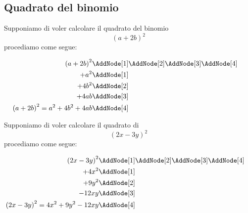 \subsection{Quadrato del binomio}
\begin{esempio}
Supponiamo di voler calcolare il quadrato del binomio \[\left(a+2b\right)^2 \]
procediamo come segue:
\begin{NodesList}
	\begin{align*}
		\left(a+2b\right)^2&\AddNode[1]\AddNode[2]\AddNode[3]\AddNode[4]\\
		+a^2&\AddNode[1]&\\ 
		+4b^2&\AddNode[2]&\\
		+4ab&\AddNode[3]\\
		\left(a+2b\right)^2=a^2+4b^2+4ab&\AddNode[4]
	\end{align*}
\end{NodesList}
\end{esempio}
\begin{esempio}
Supponiamo di voler calcolare il quadrato di \[ \left(2x-3y\right)^2\]
procediamo come segue:
\begin{NodesList}
	\begin{align*}
		\left(2x-3y\right)^2&\AddNode[1]\AddNode[2]\AddNode[3]\AddNode[4]\\
		+4x^2&\AddNode[1]&\\ 
		+9y^2&\AddNode[2]&\\
		-12xy&\AddNode[3]\\
		\left(2x-3y\right)^2=4x^2+9y^2-12xy&\AddNode[4]
	\end{align*}
\end{NodesList}
\end{esempio}
